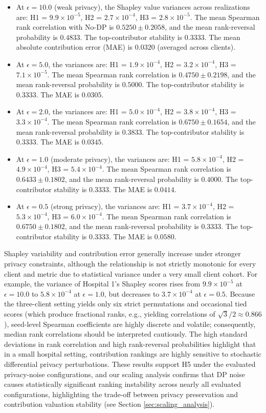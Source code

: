 \documentclass[conference]{IEEEtran}
\begin{document}
\begin{itemize}
    \item At $\epsilon=10.0$ (weak privacy), the Shapley value variances across realizations are: H1 = $9.9 \times 10^{-5}$, H2 = $2.7 \times 10^{-4}$, H3 = $2.8 \times 10^{-5}$. The mean Spearman rank correlation with No-DP is $0.5250 \pm 0.2058$, and the mean rank-reversal probability is $0.4833$. The top-contributor stability is $0.3333$. The mean absolute contribution error (MAE) is $0.0320$ (averaged across clients).
    \item At $\epsilon=5.0$, the variances are: H1 = $1.9 \times 10^{-4}$, H2 = $3.2 \times 10^{-4}$, H3 = $7.1 \times 10^{-5}$. The mean Spearman rank correlation is $0.4750 \pm 0.2198$, and the mean rank-reversal probability is $0.5000$. The top-contributor stability is $0.3333$. The MAE is $0.0305$.
    \item At $\epsilon=2.0$, the variances are: H1 = $5.0 \times 10^{-4}$, H2 = $3.8 \times 10^{-4}$, H3 = $3.3 \times 10^{-4}$. The mean Spearman rank correlation is $0.6750 \pm 0.1654$, and the mean rank-reversal probability is $0.3833$. The top-contributor stability is $0.3333$. The MAE is $0.0345$.
    \item At $\epsilon=1.0$ (moderate privacy), the variances are: H1 = $5.8 \times 10^{-4}$, H2 = $4.9 \times 10^{-4}$, H3 = $5.4 \times 10^{-4}$. The mean Spearman rank correlation is $0.6433 \pm 0.1802$, and the mean rank-reversal probability is $0.4000$. The top-contributor stability is $0.3333$. The MAE is $0.0414$.
    \item At $\epsilon=0.5$ (strong privacy), the variances are: H1 = $3.7 \times 10^{-4}$, H2 = $5.3 \times 10^{-4}$, H3 = $6.0 \times 10^{-4}$. The mean Spearman rank correlation is $0.6750 \pm 0.1802$, and the mean rank-reversal probability is $0.3333$. The top-contributor stability is $0.3333$. The MAE is $0.0580$.
\end{itemize}
Shapley variability and contribution error generally increase under stronger privacy constraints, although the relationship is not strictly monotonic for every client and metric due to statistical variance under a very small client cohort. For example, the variance of Hospital 1's Shapley scores rises from $9.9 \times 10^{-5}$ at $\epsilon=10.0$ to $5.8 \times 10^{-4}$ at $\epsilon=1.0$, but decreases to $3.7 \times 10^{-4}$ at $\epsilon=0.5$. Because the three-client setting yields only six strict permutations and occasional tied scores (which produce fractional ranks, e.g., yielding correlations of $\sqrt{3}/2 \approx 0.866$), seed-level Spearman coefficients are highly discrete and volatile; consequently, median rank correlations should be interpreted cautiously. The high standard deviations in rank correlation and high rank-reversal probabilities highlight that in a small hospital setting, contribution rankings are highly sensitive to stochastic differential privacy perturbations. These results support H5 under the evaluated privacy-noise configurations, and our scaling analysis confirms that DP noise causes statistically significant ranking instability across nearly all evaluated configurations, highlighting the trade-off between privacy preservation and contribution valuation stability (see Section \ref{sec:scaling_analysis}).
\end{document}
